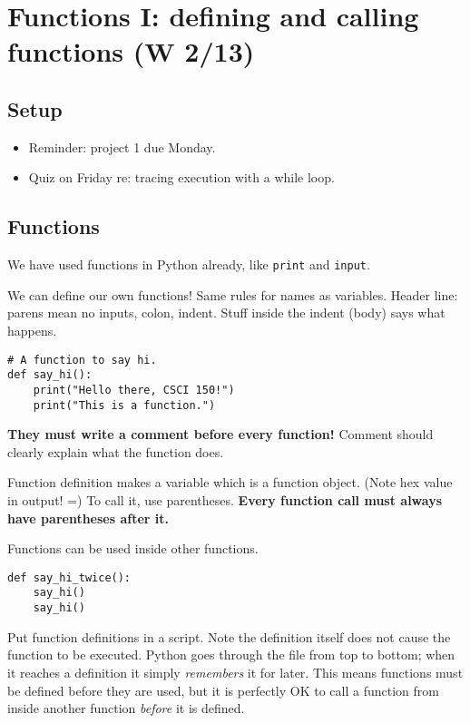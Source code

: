 \documentclass{article}
\newcommand{\ready}{\textcolor{Green}{\Checkmark}\xspace}
\begin{document}
\newpage
\section{\ready Functions I: defining and calling functions (W 2/13)}

\subsection*{Setup}
\begin{itemize}
\item Reminder: project 1 due Monday.
\item Quiz on Friday re: tracing execution with a while loop.
\end{itemize}

\subsection*{Functions}

We have used functions in Python already, like \verb|print| and
\verb|input|.

We can define our own functions!  Same rules for names as
variables. Header line: parens mean no inputs, colon, indent.  Stuff
inside the indent (body) says what happens.

\begin{verbatim}
# A function to say hi.
def say_hi():
    print("Hello there, CSCI 150!")
    print("This is a function.")
\end{verbatim}

\textbf{They must write a comment before every function!}  Comment
should clearly explain what the function does.

Function definition makes a variable which is a function object. (Note
hex value in output! =) To call it, use parentheses.  \textbf{Every
  function call must always have parentheses after it.}

Functions can be used inside other functions.

\begin{verbatim}
def say_hi_twice():
    say_hi()
    say_hi()
\end{verbatim}

Put function definitions in a script.  Note the definition itself does
not cause the function to be executed.  Python goes through the file
from top to bottom; when it reaches a definition it simply
\emph{remembers} it for later.  This means functions must be defined
before they are used, but it is perfectly OK to call a function from
inside another function \emph{before} it is defined.
\end{document}
